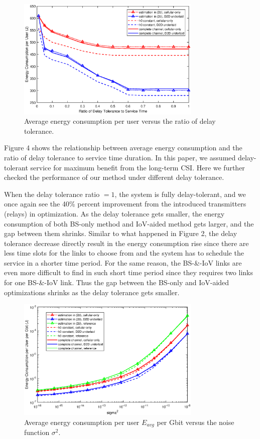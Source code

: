 \documentclass{ieeeaccess}
\begin{document}
\begin{figure} [htb]
\includegraphics*[width=8.8cm]{delays.eps}
\caption{Average energy consumption per user versus the ratio of delay tolerance.} \label{fig:5}
\end{figure}

Figure 4 shows the relationship between average energy consumption and the ratio of delay tolerance to service time duration. In this paper, we assumed delay-tolerant service for maximum benefit from the long-term CSI. Here we further checked the performance of our method under different delay tolerance.

When the delay tolerance ratio $= 1$, the system is fully delay-tolerant, and we once again see the 40\% percent improvement from the introduced transmitters (relays) in optimization. As the delay tolerance gets smaller, the energy consumption of both BS-only method and IoV-aided method gets larger, and the gap between them shrinks. Similar to what happened in Figure 2, the delay tolerance decrease %
directly result in the energy consumption rise since there are less time slots for the links to choose from and the system has to schedule the service in a shorter time period. For the same reason, the BS-\&-IoV links are even more difficult to find in such short time period since they requires two links for one BS-\&-IoV link. Thus the gap between the BS-only and IoV-aided optimizations shrinks as the delay tolerance gets smaller. 

\begin{figure} [htb]
\includegraphics*[width=8.8cm]{sigma2s.eps}
\caption{Average energy consumption per user $E_{avg}$ per Gbit versus the noise function ${\sigma ^2}$.}\label{fig:2}
\end{figure}
\end{document}
